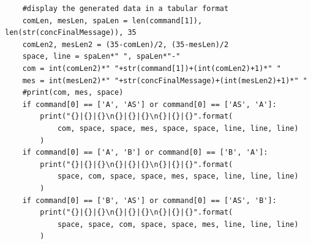 \documentclass{article}
\begin{document}
\begin{verbatim}
    #display the generated data in a tabular format
    comLen, mesLen, spaLen = len(command[1]), len(str(concFinalMessage)), 35
    comLen2, mesLen2 = (35-comLen)/2, (35-mesLen)/2
    space, line = spaLen*" ", spaLen*"-"
    com = int(comLen2)*" "+str(command[1])+(int(comLen2)+1)*" "
    mes = int(mesLen2)*" "+str(concFinalMessage)+(int(mesLen2)+1)*" "
    #print(com, mes, space)
    if command[0] == ['A', 'AS'] or command[0] == ['AS', 'A']:
        print("{}|{}|{}\n{}|{}|{}\n{}|{}|{}".format(
            com, space, space, mes, space, space, line, line, line)
        )
    if command[0] == ['A', 'B'] or command[0] == ['B', 'A']:
        print("{}|{}|{}\n{}|{}|{}\n{}|{}|{}".format(
            space, com, space, space, mes, space, line, line, line)
        )
    if command[0] == ['B', 'AS'] or command[0] == ['AS', 'B']:
        print("{}|{}|{}\n{}|{}|{}\n{}|{}|{}".format(
            space, space, com, space, space, mes, line, line, line)
        )

\end{verbatim}
\end{document}
